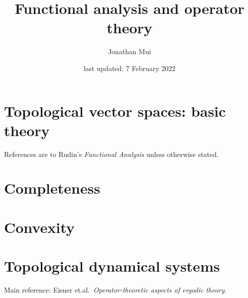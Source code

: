 \documentclass[11pt]{article}
\title{Functional analysis and operator theory}
\author{Jonathan Mui}
\date{last updated: 7 February 2022}
\begin{document}
	
	\maketitle
	
	\tableofcontents
	
	\section{Topological vector spaces: basic theory}
	References are to Rudin's \emph{Functional Analysis} unless otherwise stated.
	
	
	\section{Completeness}
	
	
	\section{Convexity}
	
	
	\section{Topological dynamical systems}
	Main reference: Eisner et.al.\, \emph{Operator-theoretic aspects of ergodic theory}.
	
	
\end{document}
